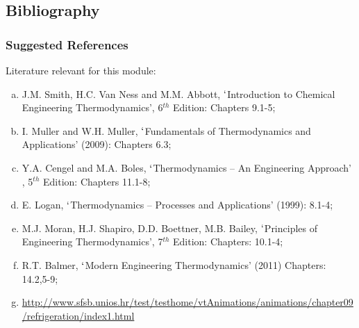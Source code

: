 \documentclass[10pt,compress]{beamer}
\begin{document}
\subsection{Bibliography} 
\begin{frame}
 \frametitle{Suggested References}
  Literature relevant for this module:
  \begin{enumerate}[(a)]
   \item J.M. Smith, H.C. Van Ness and M.M. Abbott, $\lq$Introduction to Chemical Engineering Thermodynamics', 6$^{th}$ Edition: Chapters 9.1-5;
   \item I. Muller and W.H. Muller, $\lq$Fundamentals of Thermodynamics and Applications' (2009): Chapters 6.3;
   \item Y.A. Cengel and M.A. Boles, $\lq$Thermodynamics -- An Engineering Approach' , 5$^{th}$ Edition: Chapters 11.1-8;
   \item E. Logan, $\lq$Thermodynamics -- Processes and Applications' (1999): 8.1-4;
   \item M.J. Moran, H.J. Shapiro, D.D. Boettner, M.B. Bailey, $\lq$Principles of Engineering Thermodynamics', 7$^{th}$ Edition: Chapters: 10.1-4;
   \item R.T. Balmer, $\lq$Modern Engineering Thermodynamics' (2011) Chapters: 14.2,5-9;
   \item \href{http://www.sfsb.unios.hr/test/testhome/vtAnimations/animations/chapter09/refrigeration/index1.html}{\tiny{http://www.sfsb.unios.hr/test/testhome/vtAnimations/animations/chapter09/refrigeration/index1.html}}
  \end{enumerate}
\end{frame}
\end{document}
